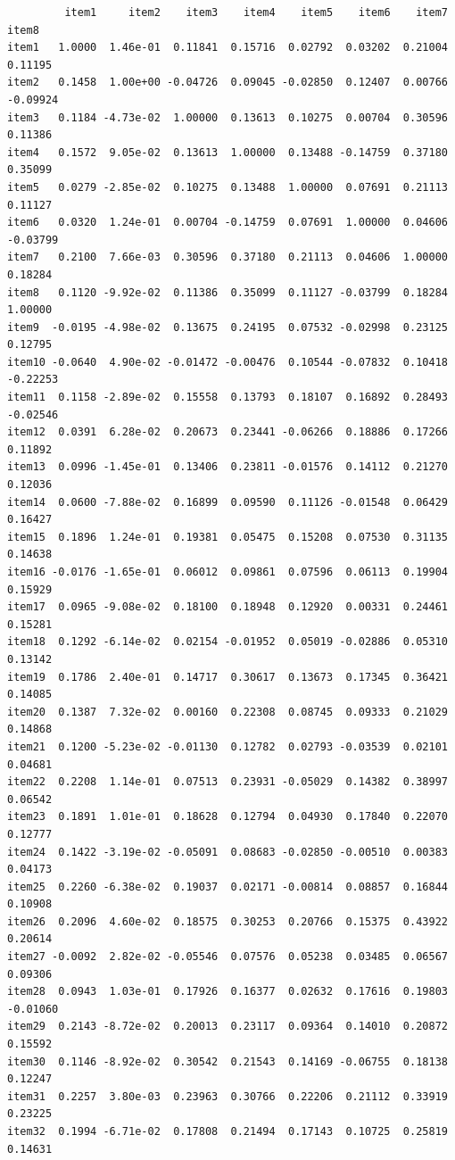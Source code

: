 \documentclass[
  a4paper,
]{ltjsbook}
\begin{document}
\begin{verbatim}
         item1     item2    item3    item4    item5    item6    item7    item8
item1   1.0000  1.46e-01  0.11841  0.15716  0.02792  0.03202  0.21004  0.11195
item2   0.1458  1.00e+00 -0.04726  0.09045 -0.02850  0.12407  0.00766 -0.09924
item3   0.1184 -4.73e-02  1.00000  0.13613  0.10275  0.00704  0.30596  0.11386
item4   0.1572  9.05e-02  0.13613  1.00000  0.13488 -0.14759  0.37180  0.35099
item5   0.0279 -2.85e-02  0.10275  0.13488  1.00000  0.07691  0.21113  0.11127
item6   0.0320  1.24e-01  0.00704 -0.14759  0.07691  1.00000  0.04606 -0.03799
item7   0.2100  7.66e-03  0.30596  0.37180  0.21113  0.04606  1.00000  0.18284
item8   0.1120 -9.92e-02  0.11386  0.35099  0.11127 -0.03799  0.18284  1.00000
item9  -0.0195 -4.98e-02  0.13675  0.24195  0.07532 -0.02998  0.23125  0.12795
item10 -0.0640  4.90e-02 -0.01472 -0.00476  0.10544 -0.07832  0.10418 -0.22253
item11  0.1158 -2.89e-02  0.15558  0.13793  0.18107  0.16892  0.28493 -0.02546
item12  0.0391  6.28e-02  0.20673  0.23441 -0.06266  0.18886  0.17266  0.11892
item13  0.0996 -1.45e-01  0.13406  0.23811 -0.01576  0.14112  0.21270  0.12036
item14  0.0600 -7.88e-02  0.16899  0.09590  0.11126 -0.01548  0.06429  0.16427
item15  0.1896  1.24e-01  0.19381  0.05475  0.15208  0.07530  0.31135  0.14638
item16 -0.0176 -1.65e-01  0.06012  0.09861  0.07596  0.06113  0.19904  0.15929
item17  0.0965 -9.08e-02  0.18100  0.18948  0.12920  0.00331  0.24461  0.15281
item18  0.1292 -6.14e-02  0.02154 -0.01952  0.05019 -0.02886  0.05310  0.13142
item19  0.1786  2.40e-01  0.14717  0.30617  0.13673  0.17345  0.36421  0.14085
item20  0.1387  7.32e-02  0.00160  0.22308  0.08745  0.09333  0.21029  0.14868
item21  0.1200 -5.23e-02 -0.01130  0.12782  0.02793 -0.03539  0.02101  0.04681
item22  0.2208  1.14e-01  0.07513  0.23931 -0.05029  0.14382  0.38997  0.06542
item23  0.1891  1.01e-01  0.18628  0.12794  0.04930  0.17840  0.22070  0.12777
item24  0.1422 -3.19e-02 -0.05091  0.08683 -0.02850 -0.00510  0.00383  0.04173
item25  0.2260 -6.38e-02  0.19037  0.02171 -0.00814  0.08857  0.16844  0.10908
item26  0.2096  4.60e-02  0.18575  0.30253  0.20766  0.15375  0.43922  0.20614
item27 -0.0092  2.82e-02 -0.05546  0.07576  0.05238  0.03485  0.06567  0.09306
item28  0.0943  1.03e-01  0.17926  0.16377  0.02632  0.17616  0.19803 -0.01060
item29  0.2143 -8.72e-02  0.20013  0.23117  0.09364  0.14010  0.20872  0.15592
item30  0.1146 -8.92e-02  0.30542  0.21543  0.14169 -0.06755  0.18138  0.12247
item31  0.2257  3.80e-03  0.23963  0.30766  0.22206  0.21112  0.33919  0.23225
item32  0.1994 -6.71e-02  0.17808  0.21494  0.17143  0.10725  0.25819  0.14631

\end{verbatim}
\end{document}
